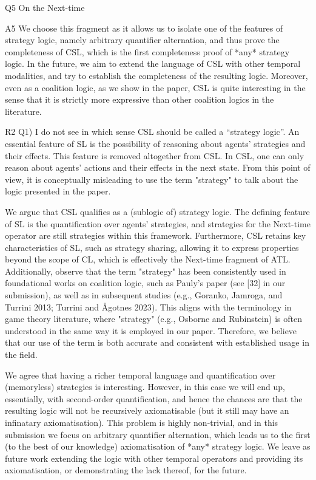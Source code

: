  Q5 On the Next-time
 
 A5 We choose this fragment as it allows us to isolate one of the features of strategy logic, namely arbitrary quantifier alternation, and thus prove the completeness of CSL, which is the first completeness proof of *any* strategy logic. In the future, we aim to extend the language of CSL with other temporal modalities, and try to establish the completeness of the resulting logic. Moreover, even as a coalition logic, as we show in the paper, CSL is quite interesting in the sense that it is strictly more expressive than other coalition logics in the literature. 


 R2
Q1) I do not see in which sense CSL should be called a “strategy logic”. An essential feature of SL is the possibility of reasoning about agents’ strategies and their effects. This feature is removed altogether from CSL. In CSL, one can only reason about agents’ actions and their effects in the next state. From this point of view, it is conceptually misleading to use the term "strategy" to talk about the logic presented in the paper.

We argue that CSL qualifies as a (sublogic of) strategy logic. The defining feature of SL is the quantification over agents' strategies, and strategies for the Next-time operator are still strategies within this framework. Furthermore, CSL retains key characteristics of SL, such as strategy sharing, allowing it to express properties beyond the scope of CL, which is effectively the Next-time fragment of ATL. Additionally, observe that the term "strategy" has been consistently used in foundational works on coalition logic, such as Pauly's paper (see [32] in our submission), as well as in subsequent studies (e.g., Goranko, Jamroga, and Turrini 2013; Turrini and Ågotnes 2023). This aligns with the terminology in game theory literature, where "strategy" (e.g., Osborne and Rubinstein) is often understood in the same way it is employed in our paper. Therefore, we believe that our use of the term is both accurate and consistent with established usage in the field.

We agree that having a richer temporal language and quantification over (memoryless) strategies is interesting. However, in this case we will end up, essentially, with second-order quantification, and hence the chances are that the resulting logic will not be recursively axiomatisable (but it still may have an infinatary axiomatisation). This problem is highly non-trivial, and in this submission we focus on arbitrary quantifier alternation, which leads us to the first (to the best of our knowledge) axiomatisation of *any* strategy logic. We leave as future work extending the logic with other temporal operators and providing its axiomatisation, or demonstrating the lack thereof, for the future.

